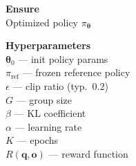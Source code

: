 \documentclass[11pt]{article}
\begin{document}
\begin{algorithm}[p]\small
\caption{GRPO (Group Relative Policy Optimization)}\label{alg:grpo}
\vspace{2pt}
\noindent
\begin{minipage}[t]{0.28\linewidth}
\renewcommand{\arraystretch}{1.12}
\textbf{Ensure} \\[2pt]
Optimized policy $\pi_{\boldsymbol{\theta}}$

\vspace{6pt}
\textbf{Hyperparameters} \\[2pt]
$\boldsymbol{\theta}_0$ — init policy params \\
$\pi_{\text{ref}}$ — frozen reference policy \\
$\epsilon$ — clip ratio (typ.\ $0.2$) \\
$G$ — group size \\
$\beta$ — KL coefficient \\
$\alpha$ — learning rate \\
$K$ — epochs \\
$R(\mathbf{q}, \mathbf{o})$ — reward function


\end{minipage}
\end{algorithm}
\end{document}
